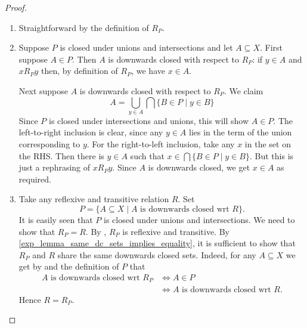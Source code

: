 \begin{proof}\leavevmode
    \begin{enumerate}
        \item Straightforward by the definition of $R_P$.

        \item Suppose $P$ is closed under unions and intersections and let $A
              \subseteq X$.  First suppose $A \in P$. Then $A$ is downwards
              closed with respect to $R_P$: if $y \in A$ and $x{R_P}y$ then, by
              definition of $R_P$, we have $x \in A$.

              Next suppose $A$ is downwards closed with respect to $R_P$. We
              claim \[ A = \bigcup_{y \in A}\bigcap\{B \in P \mid y \in B\} \]
              Since $P$ is closed under intersections and unions, this will
              show $A \in P$. The left-to-right inclusion is clear, since any
              $y \in A$ lies in the term of the union corresponding to $y$. For
              the right-to-left inclusion, take any $x$ in the set on the RHS.
              Then there is $y \in A$ such that $x \in \bigcap\{B \in P \mid y
              \in B\}$. But this is just a rephrasing of $x{R_P}y$. Since $A$
              is downwards closed, we get $x \in A$ as required.

        \item Take any reflexive and transitive relation $R$. Set
              \[
                  P
                  =
                  \{A \subseteq X \mid A \text{ is downwards closed wrt } R\}.
                \]
              It is easily seen that $P$ is closed under unions and
              intersections. We need to show that $R_P = R$.
              By , $R_P$ is reflexive and
              transitive.  By \cref{exp_lemma_same_dc_sets_implies_equality}, it is
              sufficient to show that $R_P$ and $R$ share the same downwards
              closed sets.  Indeed, for any $A \subseteq X$ we get by
               and the definition of $P$ that
              \[
              \begin{aligned}
                  A \text{ is downwards closed wrt } R_P
                  &\iff A \in P \\
                  &\iff A \text{ is downwards closed wrt } R.
              \end{aligned}
              \]
              Hence $R = R_P$.
    \end{enumerate}
\end{proof}

